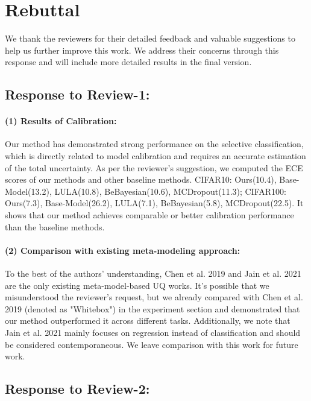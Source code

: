 \section{Rebuttal}
We thank the reviewers for their detailed feedback and valuable suggestions to help us further improve this work. We address their concerns through this response and will include more detailed results in the final version.

\subsection{Response to Review-1:}

\paragraph{(1) Results of Calibration:}
Our method has demonstrated strong performance on the selective classification, which is directly related to model calibration and requires an accurate estimation of the total uncertainty. As per the reviewer's suggestion, we computed the ECE scores of our methods and other baseline methods. 
CIFAR10: Ours(10.4), Base-Model(13.2), LULA(10.8), BeBayesian(10.6), MCDropout(11.3); 
CIFAR100: Ours(7.3), Base-Model(26.2), LULA(7.1), BeBayesian(5.8), MCDropout(22.5). 
It shows that our method achieves comparable or better calibration performance than the baseline methods.

\paragraph{(2) Comparison with existing meta-modeling approach:}
To the best of the authors' understanding, Chen et al. 2019 and Jain et al. 2021 are the only existing meta-model-based UQ works. It’s possible that we misunderstood the reviewer’s request, but we already compared with Chen et al. 2019 (denoted as "Whitebox") in the experiment section and demonstrated that our method outperformed it across different tasks. Additionally, we note that Jain et al. 2021 mainly focuses on regression instead of classification and should be considered contemporaneous. We leave comparison with this work for future work.

\subsection{Response to Review-2:}

